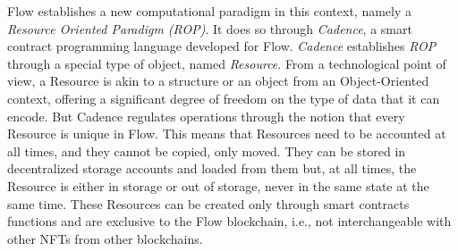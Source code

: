 \documentclass[../main.tex]{subfiles}
\begin{document}
\par
Flow establishes a new computational paradigm in this context, namely a \textit{Resource Oriented Paradigm (ROP)}. It does so through \textit{Cadence}, a smart contract programming language developed for Flow. \textit{Cadence} establishes \textit{ROP} through a special type of object, named \textit{Resource}. From a technological point of view, a Resource is akin to a structure or an object from an Object-Oriented context, offering a significant degree of freedom on the type of data that it can encode. But Cadence regulates operations through the notion that every Resource is unique in Flow. This means that Resources need to be accounted at all times, and they cannot be copied, only moved. They can be stored in decentralized storage accounts and loaded from them but, at all times, the Resource is either in storage or out of storage, never in the same state at the same time. These Resources can be created only through smart contracts functions and are exclusive to the Flow blockchain, i.e., not interchangeable with other NFTs from other blockchains.
\end{document}
